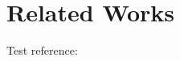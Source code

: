 \section{Related Works}


Test reference:\cite{Liu:MSST:12}
\cite{SlurmBBGuide}
\cite{Romanus:CORR:15}


